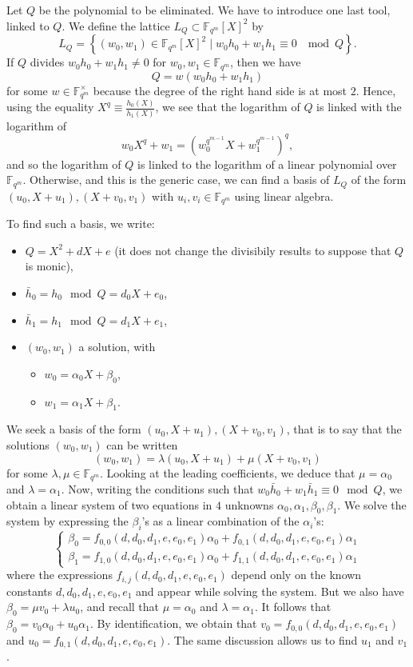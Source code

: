 \documentclass[a4paper,11pt]{article}
\theoremstyle{break}
\theoremstyle{sc}
\theoremstyle{definition}
\theoremstyle{remark}
\begin{document}
Let $Q$ be the polynomial to be eliminated. We have to introduce one last tool,
linked to $Q$. We define the lattice $L_Q\subset
\mathbb{F}_{q^m}[X]^2$ by 
\[
  L_Q = \left\{ (w_0,
    w_1)\in\mathbb{F}_{q^m}[X]^2\;|\;w_0h_0+w_1h_1\equiv0\;\mod Q \right\}.
\]
If $Q$ divides $w_0h_0+w_1h_1\neq0$ for $w_0, w_1\in \mathbb{F}_{q^m}$, then we have
\[
  Q = w(w_0h_0+w_1h_1)
\]
for some $w\in\mathbb{F}_{q^m}^\times$ because the degree
of the right hand side is at most $2$. Hence, using the equality
$X^q\equiv\frac{h_0(X)}{h_1(X)}$, we see that the logarithm of $Q$ is linked
with the logarithm of 
\[
w_0X^q+w_1=(w_0^{q^{m-1}}X+w_1^{q^{m-1}})^q,
\]
and so the
logarithm of $Q$ is linked to the logarithm of a linear
polynomial over $\mathbb{F}_{q^m}$. Otherwise, and this is the generic
case, we can find a basis of $L_Q$
of the form $(u_0, X+u_1), (X+v_0, v_1)$ with $u_i, v_i\in\mathbb{F}_{q^m}$
using linear algebra.

To find such a basis, we write:
\begin{itemize}
  \item $Q = X^2 + dX+ e$ (it does not
change the divisibily results to suppose that $Q$ is monic),
\item $\bar h_0 = h_0 \mod Q = d_0X+e_0$,
\item  $\bar h_1 = h_1 \mod Q = d_1X+e_1$, 
\item $(w_0, w_1)$ a solution, with
  \begin{itemize}
    \item $w_0=\alpha_0X+\beta_0$,
    \item $w_1=\alpha_1X+\beta_1$.
  \end{itemize}
\end{itemize}
We seek a basis of the form
$(u_0, X + u_1), (X+v_0, v_1)$, that is to say that the solutions $(w_0, w_1)$
can be written 
\[
  (w_0, w_1)=\lambda(u_0, X+u_1)+\mu(X+v_0, v_1)
\]
for some $\lambda, \mu\in\mathbb{F}_{q^m}$.
Looking at the leading coefficients, we deduce that $\mu =
\alpha_0$ and $\lambda=\alpha_1$. Now, writing the conditions such that $w_0\bar
h_0+w_1\bar h_1\equiv 0 \mod Q$, we obtain a linear system of two equations in
$4$ unknowns $\alpha_0, \alpha_1, \beta_0, \beta_1$. We solve the system by
expressing the $\beta_i$'s as a linear combination of the $\alpha_i$'s:
\[
  \begin{cases}
    \beta_0 = f_{0,0}(d, d_0, d_1, e, e_0, e_1)\alpha_0 + f_{0,1}(d, d_0, d_1, e,
    e_0, e_1)\alpha_1 \\
    \beta_1 = f_{1,0}(d, d_0, d_1, e, e_0, e_1)\alpha_0 + f_{1,1}(d, d_0, d_1, e,
    e_0, e_1)\alpha_1 
  \end{cases}
\]
where the expressions $f_{i, j}(d, d_0, d_1, e, e_0, e_1)$ depend only on the
known constants $d, d_0, d_1, e, e_0, e_1$ and appear while solving the system. But we also have $\beta_0 = \mu v_0
+ \lambda u_0$, and recall that $\mu = \alpha_0$ and $\lambda = \alpha_1$. It
follows that $\beta_0 = v_0\alpha_0+u_0\alpha_1$. By identification, we obtain
that $v_0 = f_{0,0}(d, d_0, d_1, e, e_0, e_1)$ and $u_0 = f_{0,1}(d, d_0, d_1,
e, e_0, e_1)$. The same discussion allows us to find $u_1$ and $v_1$.
\end{document}
